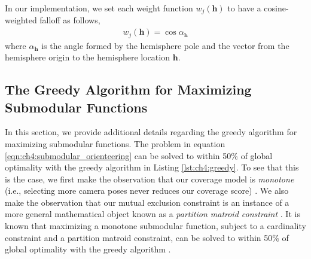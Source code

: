 In our implementation, we set each weight function $w_j(\mathbf{h})$ to have a cosine-weighted falloff as follows,  
%
\begin{equation}
\begin{aligned}
w_j(\mathbf{h}) = \cos \alpha_\mathbf{h}
\end{aligned}
\end{equation}
%
where $\alpha_\mathbf{h}$ is the angle formed by the hemisphere pole and the vector from the hemisphere origin to the hemisphere location $\mathbf{h}$.

\subsection{The Greedy Algorithm for Maximizing Submodular Functions}
\label{sec:ch4:greedy}

In this section, we provide additional details regarding the greedy algorithm for maximizing submodular functions.
The problem in equation \ref{eqn:ch4:submodular_orienteering} can be solved to within 50\% of global optimality with the greedy algorithm in Listing \ref{lst:ch4:greedy}.
To see that this is the case, we first make the observation that our coverage model is \emph{monotone} (i.e., selecting more camera poses never reduces our coverage score) \cite{krause:2014}.
We also make the observation that our mutual exclusion constraint is an instance of a more general mathematical object known as a \emph{partition matroid constraint} \cite{krause:2014}.
It is known that maximizing a monotone submodular function, subject to a cardinality constraint and a partition matroid constraint, can be solved to within 50\% of global optimality with the greedy algorithm \cite{krause:2014}.


